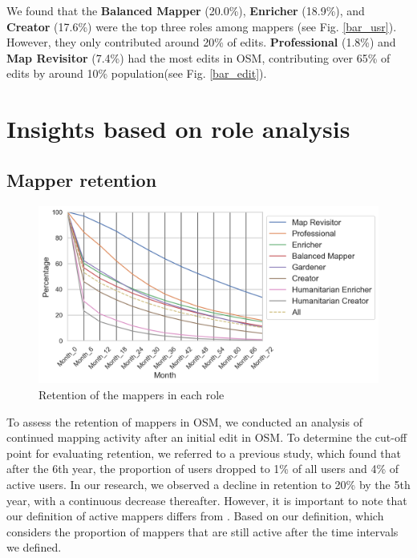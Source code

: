 \documentclass[manuscript,screen,review]{acmart}
\begin{document}
We found that the \textbf{Balanced Mapper} (20.0\%), \textbf{Enricher} (18.9\%), and \textbf{Creator} (17.6\%) were the top three roles among mappers (see Fig. \ref{bar_usr}). However, they only contributed around 20\% of edits. \textbf{Professional} (1.8\%) and \textbf{Map Revisitor} (7.4\%) had the most edits in OSM, contributing over 65\% of edits by around 10\% population(see Fig. \ref{bar_edit}).

\section{Insights based on role analysis}

\subsection{Mapper retention} \label{Retention}

\begin{figure}[h!]
  \centering
  \includegraphics[width=\linewidth]{Fig4-survival.png}
  \caption{Retention of the mappers in each role}
  \label{survival}
\end{figure}

To assess the retention of mappers in OSM, we conducted an analysis of continued mapping activity after an initial edit in OSM. To determine the cut-off point for evaluating retention, we referred to a previous study\cite{BeginDR18}, which found that after the 6th year, the proportion of users dropped to 1\% of all users and 4\% of active users. In our research, we observed a decline in retention to 20\% by the 5th year, with a continuous decrease thereafter. However, it is important to note that our definition of active mappers differs from \cite{BeginDR18}. Based on our definition, which considers the proportion of mappers that are still active after the time intervals we defined.
\end{document}
